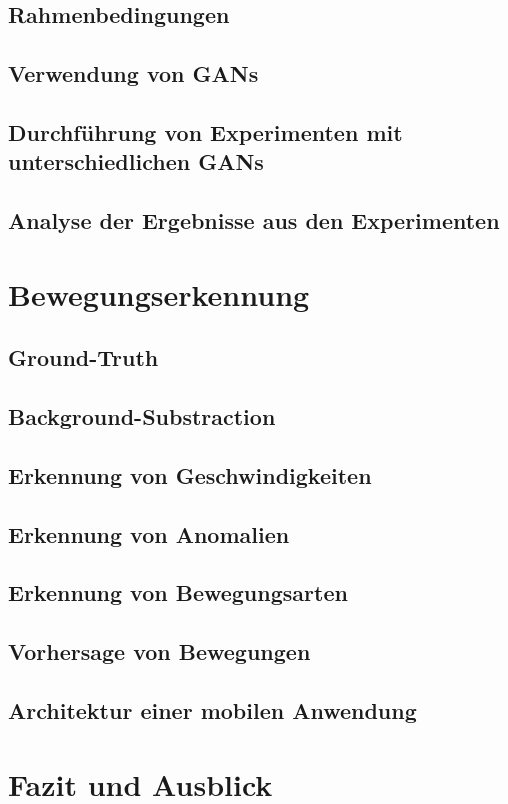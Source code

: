 \documentclass{hsflensburg}
\begin{document}
  \section{Rahmenbedingungen}
  \section{Verwendung von GANs}
  \section{Durchführung von Experimenten mit unterschiedlichen GANs}
  \section{Analyse der Ergebnisse aus den Experimenten}

  \chapter{Bewegungserkennung}
  \section{Ground-Truth}
  \section{Background-Substraction}
  \section{Erkennung von Geschwindigkeiten}
  \section{Erkennung von Anomalien}
  \section{Erkennung von Bewegungsarten}
  \section{Vorhersage von Bewegungen}
  \section{Architektur einer mobilen Anwendung}

  \chapter{Fazit und Ausblick}

  \printbibliography
\end{document}
